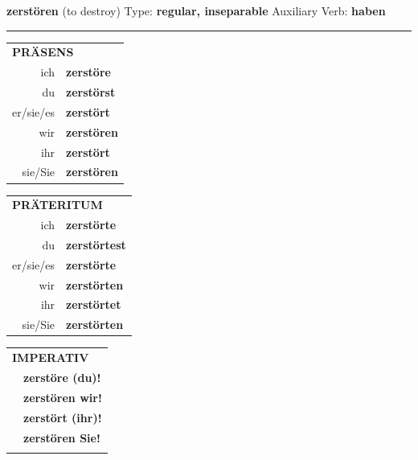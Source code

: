 \documentclass[10pt,a4paper]{revtex4-2}
\begin{document}
\begin{verbbox}
    {\Large \bf zerstören} (to destroy) \hfill Type: \textbf{regular, inseparable} \hfill Auxiliary Verb: \textbf{haben} 
    
     \vspace{5pt}

    \hrule
    
    \vspace{5pt}

  \begin{tabular}{rl}
     \multicolumn{2}{l}{\textbf{PRÄSENS} }\\
    ich & \textbf{zerstöre}\\
    du & \textbf{zerstörst}\\
    er/sie/es & \textbf{zerstört}\\
    wir & \textbf{zerstören}\\
    ihr & \textbf{zerstört}\\
    sie/Sie & \textbf{zerstören}\\
  \end{tabular}
  \hfill
     \begin{tabular}{rl}
    \multicolumn{2}{l}{\textbf{PRÄTERITUM} }\\
    ich & \textbf{zerstörte}\\
    du & \textbf{zerstörtest}\\
    er/sie/es & \textbf{zerstörte}\\
    wir & \textbf{zerstörten}\\
    ihr & \textbf{zerstörtet}\\
    sie/Sie & \textbf{zerstörten}\\
  \end{tabular}
  \hfill
  \begin{tabular}{rl}
     \multicolumn{2}{l}{\textbf{IMPERATIV} }\\
   & \textbf{zerstöre (du)!}\\
   & \textbf{zerstören wir!}\\
   & \textbf{zerstört (ihr)!}\\
   & \textbf{zerstören Sie!}\\
   & \vspace{10pt}
  \end{tabular}

    \vspace{10pt}


\end{verbbox}
\end{document}
